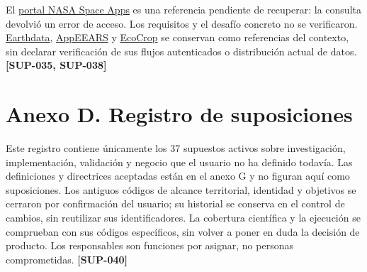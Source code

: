 \documentclass[10pt,a4paper]{article}
\begin{document}
El \href{https://www.spaceappschallenge.org/}{portal NASA Space Apps} es una referencia pendiente de recuperar: la consulta devolvió un error de acceso. Los requisitos y el desafío concreto no se verificaron. \href{https://www.earthdata.nasa.gov/}{Earthdata}, \href{https://appeears.earthdatacloud.nasa.gov/}{AppEEARS} y \href{https://ecocrop.apps.fao.org/}{EcoCrop} se conservan como referencias del contexto, sin declarar verificación de sus flujos autenticados o distribución actual de datos. \textbf{[SUP-035, SUP-038]}


\clearpage\section{Anexo D. Registro de suposiciones}\label{anexo-d-registro-de-suposiciones}

Este registro contiene únicamente los 37 supuestos activos sobre investigación, implementación, validación y negocio que el usuario no ha definido todavía. Las definiciones y directrices aceptadas están en el anexo G y no figuran aquí como suposiciones. Los antiguos códigos de alcance territorial, identidad y objetivos se cerraron por confirmación del usuario; su historial se conserva en el control de cambios, sin reutilizar sus identificadores. La cobertura científica y la ejecución se comprueban con sus códigos específicos, sin volver a poner en duda la decisión de producto. Los responsables son funciones por asignar, no personas comprometidas. \textbf{[SUP-040]}
\end{document}
